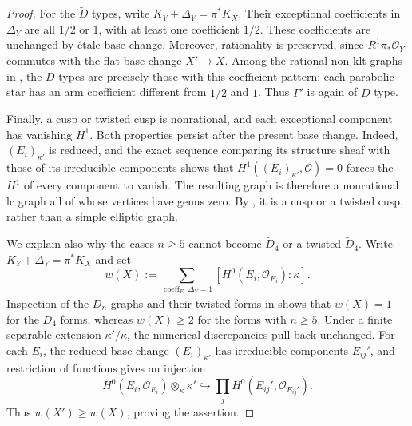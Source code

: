 \documentclass[12pt]{amsart}
\def\tilde{\widetilde}
\newcommand{\sO}{\mathcal{O}}
\theoremstyle{plain}
\theoremstyle{definition}
\theoremstyle{remark}
\newtheorem{defn and notation}[thm]{Definition and Notation}
\theoremstyle{plain}
\numberwithin{equation}{thm}
\begin{document}
\begin{proof}
For the $\tilde D$ types, write $K_Y+\Delta_Y=\pi^*K_X$.
Their exceptional coefficients in $\Delta_Y$ are all $1/2$ or $1$, with at least one coefficient $1/2$.
These coefficients are unchanged by \'etale base change.
Moreover, rationality is preserved, since $R^1\pi_*\sO_Y$ commutes with the flat base change $X'\to X$.
Among the rational non-klt graphs in \cite[Figures 2 and 3]{Sato23}, the $\tilde D$ types are precisely those with this coefficient pattern: each parabolic star has an arm coefficient different from $1/2$ and $1$.
Thus $\Gamma'$ is again of $\tilde D$ type.

Finally, a cusp or twisted cusp is nonrational, and each exceptional component has vanishing $H^1$.
Both properties persist after the present base change.
Indeed, $(E_i)_{\kappa'}$ is reduced, and the exact sequence comparing its structure sheaf with those of its irreducible components shows that $H^1((E_i)_{\kappa'},\sO)=0$ forces the $H^1$ of every component to vanish.
The resulting graph is therefore a nonrational lc graph all of whose vertices have genus zero.
By \cite[Figure 4]{Sato23}, it is a cusp or a twisted cusp, rather than a simple elliptic graph.

We explain also why the cases $n\geq5$ cannot become $\tilde D_4$ or a twisted $\tilde D_4$.
Write $K_Y+\Delta_Y=\pi^*K_X$ and set
\[
w(X):=\sum_{\operatorname{coeff}_{E_i}\Delta_Y=1}
       [H^0(E_i,\sO_{E_i}):\kappa].
\]
Inspection of the $\tilde D_n$ graphs and their twisted forms in \cite[Figures 2 and 3]{Sato23} shows that $w(X)=1$ for the $\tilde D_4$ forms, whereas $w(X)\geq2$ for the forms with $n\geq5$.
Under a finite separable extension $\kappa'/\kappa$, the numerical discrepancies pull back unchanged.
For each $E_i$, the reduced base change $(E_i)_{\kappa'}$ has irreducible components $E_{ij}'$, and restriction of functions gives an injection
\[
H^0(E_i,\sO_{E_i})\otimes_\kappa\kappa'
\hookrightarrow\prod_j H^0(E_{ij}',\sO_{E_{ij}'}).
\]
Thus $w(X')\geq w(X)$, proving the assertion.
\end{proof}
\end{document}
